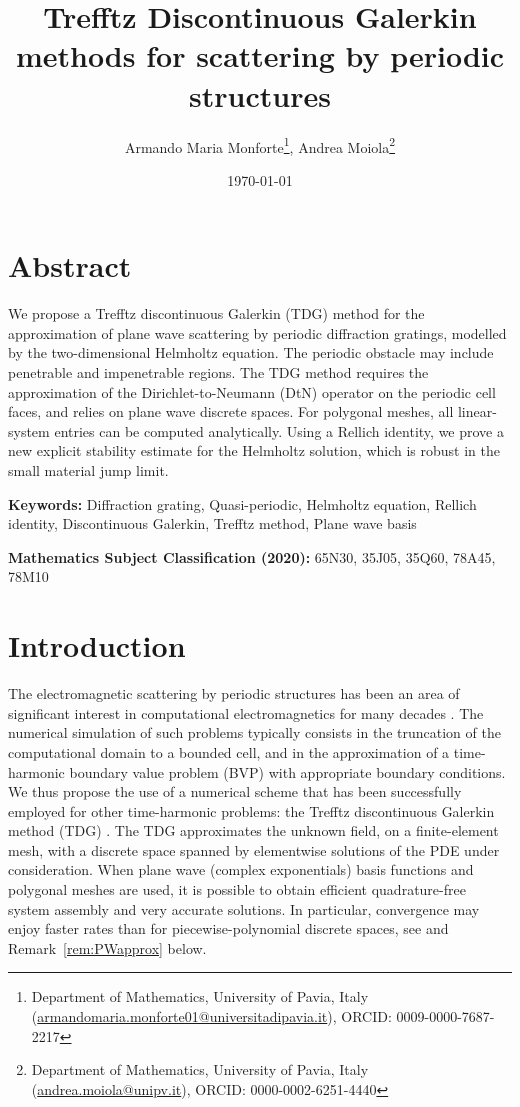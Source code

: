 \documentclass[a4paper,10pt]{article}
\title{Trefftz Discontinuous Galerkin methods for scattering by periodic structures}
\author{Armando Maria Monforte\thanks{Department of Mathematics, University of Pavia, Italy
		(\href{mailto:armandomaria.monforte01@universitadipavia.it}{armandomaria.monforte01@universitadipavia.it}), ORCID: 0009-0000-7687-2217},
	Andrea Moiola\thanks{Department of Mathematics, University of Pavia, Italy 
		(\href{mailto:andrea.moiola@unipv.it}{andrea.moiola@unipv.it}), ORCID: 0000-0002-6251-4440}	
}
\date{\today}
\begin{document}
	\newtheorem{thm}{Theorem}[section]
	\newtheorem{prop}[thm]{Proposition}
	\newtheorem{lem}[thm]{Lemma}
	\newtheorem{corol}[thm]{Corollary}
	\newtheorem{defin}[thm]{Definition}
	
	\newtheorem{rem}[thm]{Remark}
	\newtheorem{example}[thm]{Example}
	
	
	\maketitle 
	
	\section*{Abstract}
	
	
	
	We propose a Trefftz discontinuous Galerkin (TDG) method for the approximation of plane wave scattering by periodic diffraction gratings, modelled by the two-dimensional Helmholtz equation.
	The periodic obstacle may include penetrable and impenetrable regions.
	The TDG method requires the approximation of the Dirichlet-to-Neumann (DtN) operator on the periodic cell faces, and relies on plane wave discrete spaces.
	For polygonal meshes, all linear-system entries can be computed analytically.
	Using a Rellich identity, we prove a new explicit stability estimate for the Helmholtz solution, which is robust in the small material jump limit.
	
	\bigskip\noindent
	{\bf Keywords:} \; Diffraction grating, Quasi-periodic, Helmholtz equation, Rellich identity, Discontinuous Galerkin, Trefftz method, Plane wave basis
	
	\bigskip\noindent
	{\bf Mathematics Subject Classification (2020):} \;
	65N30,
	35J05,  
	35Q60, 
	78A45, 
	78M10 
	
	\section{Introduction}
	The electromagnetic scattering by periodic structures has been an area of significant interest in computational electromagnetics for many decades \cite{BaoLi2022,BonnetBD1994}.
	The numerical simulation of such problems typically consists in the truncation of the computational domain to a bounded cell, and in the approximation of a time-harmonic boundary value problem (BVP) with appropriate boundary conditions.
	We thus propose the use of a numerical scheme that has been successfully employed for other time-harmonic problems: the Trefftz discontinuous Galerkin method (TDG) \cite{Hiptmair2016,Hiptmair2011}.
	The TDG approximates the unknown field, on a finite-element mesh, with a discrete space spanned by elementwise solutions of the PDE under consideration.
	When plane wave (complex exponentials) basis functions and polygonal meshes are used, it is possible to obtain efficient quadrature-free system assembly and very accurate solutions.
	In particular, convergence may enjoy faster rates than for piecewise-polynomial discrete spaces, see \cite{Moiola2011} and Remark~\ref{rem:PWapprox} below.
	
\end{document}
